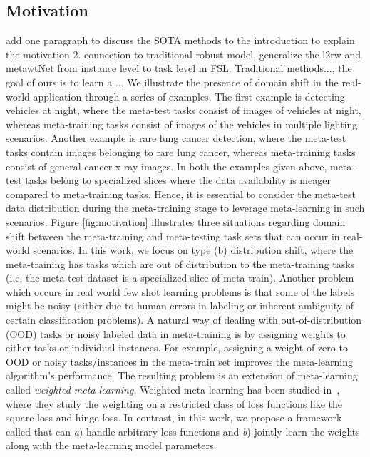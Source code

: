 \subsection{Motivation} 
{\color{red} add one paragraph to discuss the SOTA methods to the introduction to explain the motivation
2. connection to traditional robust model, generalize the l2rw and metawtNet from instance level to task level in FSL. Traditional methods..., the goal of ours is to learn a ...}
We illustrate the presence of domain shift in the real-world application through a series of examples. The first example is detecting vehicles at night, where the meta-test tasks consist of images of vehicles at night, whereas meta-training tasks consist of images of the vehicles in multiple lighting scenarios.  Another example is rare lung cancer detection, where the meta-test tasks contain images belonging to rare lung cancer, whereas meta-training tasks consist of general cancer x-ray images.  In both the examples given above, meta-test tasks belong to specialized slices where the data availability is meager compared to meta-training tasks. Hence, it is essential to consider the meta-test data distribution during the meta-training stage to leverage meta-learning in such scenarios. Figure \ref{fig:motivation} illustrates three situations regarding domain shift between the meta-training and meta-testing task sets that can occur in real-world scenarios. In this work, we focus on type (b) distribution shift, where the meta-training has tasks which are out of distribution to the meta-training tasks (i.e. the meta-test dataset is a specialized slice of meta-train). Another problem which occurs in real world few shot learning problems is that some of the labels might be noisy (either due to human errors in labeling or inherent ambiguity of certain classification problems). A natural way of dealing with out-of-distribution (OOD) tasks or noisy labeled data in meta-training is by assigning weights to either tasks or individual instances. For example, assigning a weight of zero to OOD or noisy tasks/instances in the meta-train set improves the meta-learning algorithm's performance. The resulting problem is an extension of meta-learning called \emph{weighted meta-learning}. Weighted meta-learning has been studied in~\citep{cai2020weightedmeta}, where they study the weighting on a restricted class of loss functions like the square loss and hinge loss. In contrast, in this work, we propose a framework called \sysname{} that can {\textit{a}}) handle arbitrary loss functions and \textit{b}) jointly learn the weights along with the meta-learning model parameters. 


